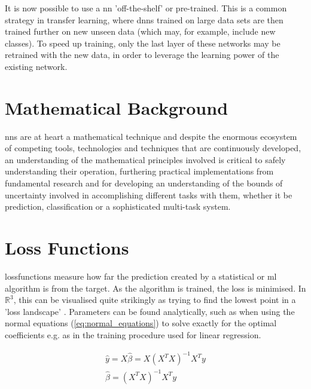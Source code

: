 It is now possible to use a \gls{nn} 'off-the-shelf' or pre-trained. This is a common strategy in transfer learning, where \gls{dnn}s trained on large data sets are then trained further on new unseen data (which may, for example, include new classes). To speed up training, only the last layer of these networks may be retrained with the new data, in order to leverage the learning power of the existing network. 
\bigskip

\section*{Mathematical Background}


\gls{nn}s are at heart a mathematical technique and despite the enormous ecosystem of competing tools, technologies and techniques that are continuously developed, an understanding of the mathematical principles involved  is critical to safely understanding their operation, furthering practical implementations from fundamental research and for developing an understanding of the bounds of uncertainty involved in accomplishing different tasks with them, whether it be prediction, classification or a sophisticated multi-task system.

\section{Loss Functions}

\Gls{lossfunction}s measure how far the prediction created by a statistical or \gls{ml} algorithm is from the target. As the algorithm is trained, the loss is minimised. In $\mathds{R}^3$, this can be visualised quite strikingly as trying to find the lowest point in a 'loss landscape' \cite{loss_landscape}. Parameters can be found analytically, such as when using the normal equations (\ref{eq:normal_equations}) to solve exactly for the optimal coefficients e.g. as in the training procedure used for linear regression.
\bigskip

\begin{align}
    \hat{y} = X\hat{\beta} = X(X^TX)^{-1}X^Ty \\
    \hat{\beta} = (X^TX)^{-1}X^Ty
    \label{eq:normal_equations}
\end{align}

